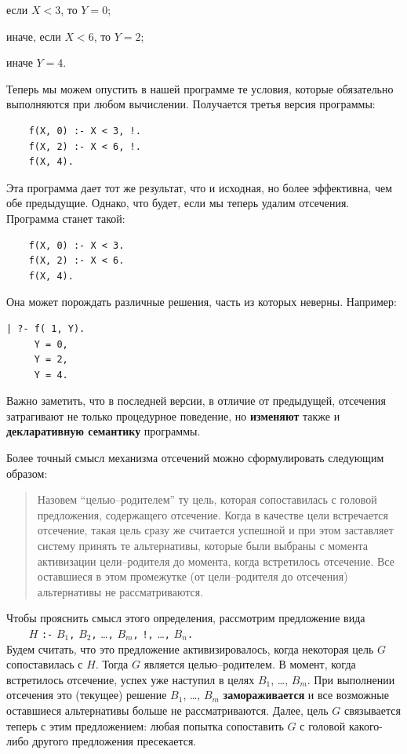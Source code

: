 \documentclass[12pt, openany, twoside]{book} %
\begin{document}
если $X < 3$, то $Y = 0$;

иначе, если $X < 6$, то $Y = 2$;

иначе $Y = 4$.

Теперь мы можем опустить в нашей программе те условия, которые обязательно выполняются при любом вычислении. Получается третья версия программы:
{\tt \begin{verbatim}
    f(X, 0) :- X < 3, !.
    f(X, 2) :- X < 6, !.
    f(X, 4).
\end{verbatim}}

\noindent Эта программа дает тот же результат, что и исходная, но более эффективна, чем обе предыдущие. Однако, что будет, если мы теперь удалим отсечения. Программа станет такой:
{\tt \begin{verbatim}
    f(X, 0) :- X < 3.
    f(X, 2) :- X < 6.
    f(X, 4).
\end{verbatim}}
\noindent Она может порождать различные решения, часть из которых неверны. Например:

{\tt \begin{verbatim}
| ?- f( 1, Y).
     Y = 0,
     Y = 2,
     Y = 4.
 \end{verbatim}}

Важно заметить, что в последней версии, в отличие от предыдущей, отсечения затрагивают не только процедурное поведение, но {\bf изменяют} также и {\bf декларативную семантику} программы.

Более точный смысл механизма отсечений можно сформулировать следующим образом:
\begin{quote}
Назовем ``целью--родителем'' ту цель, которая сопоставилась с головой предложения, содержащего отсечение. Когда в качестве цели встречается отсечение, такая цель сразу же считается успешной и при этом заставляет систему принять те альтернативы, которые были выбраны с момента активизации цели--родителя до момента, когда встретилось отсечение. Все оставшиеся в этом промежутке (от цели--родителя до отсечения) альтернативы не рассматриваются.
\end{quote}

Чтобы прояснить смысл этого определения, рассмотрим предложение вида\\[1ex]
\verb|    |$H$ {\tt :-} $B_1${\tt,} $B_2${\tt,} \ldots {\tt ,} $B_m${\tt,}
    {\tt !,} \ldots {\tt ,} $B_n${\tt.}\\[-0.5ex]

\noindent Будем считать, что это предложение активизировалось, когда некоторая цель $G$ сопоставилась с $H$. Тогда $G$ является целью--родителем. В момент, когда встретилось отсечение, успех уже наступил в целях $B_1$, \ldots, $B_m$. При выполнении отсечения это (текущее) решение $B_1$, \ldots, $B_m$ {\bf замораживается} и все возможные оставшиеся альтернативы больше не рассматриваются. Далее, цель $G$ связывается теперь с этим предложением: любая попытка сопоставить $G$ с головой какого-либо другого предложения пресекается.
\end{document}
